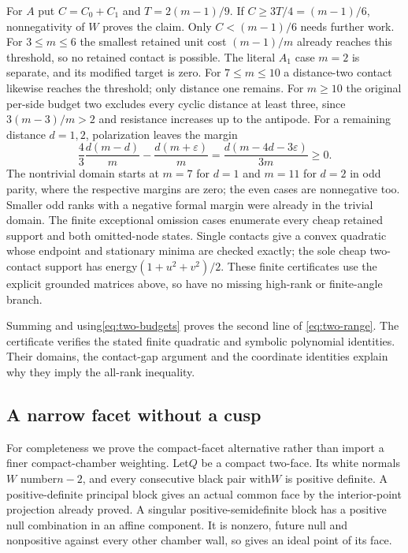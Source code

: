 \documentclass[11pt]{article}
\theoremstyle{remark}\newtheorem{remark}[theorem]{Remark}
\begin{document}
For $A$ put $C=C_0+C_1$ and $T=2(m-1)/9$.
If $C\ge3T/4=(m-1)/6$, nonnegativity of $W$ proves the claim.
Only $C<(m-1)/6$ needs further work. For $3\le m\le6$ the
smallest retained unit cost $(m-1)/m$ already reaches this
threshold, so no retained contact is possible. The literal
$A_1$ case $m=2$ is separate, and its modified target is zero.
For $7\le m\le10$ a distance-two contact likewise reaches the
threshold; only distance one remains. For $m\ge10$ the original
per-side budget two excludes every cyclic distance at least three,
since $3(m-3)/m>2$ and resistance increases up to the antipode.
For a remaining distance $d=1,2$, polarization leaves the margin
\[
 \frac43\frac{d(m-d)}m-\frac{d(m+\varepsilon)}m
 =\frac{d(m-4d-3\varepsilon)}{3m}\ge0.
\]
The nontrivial domain starts at $m=7$ for $d=1$ and $m=11$ for
$d=2$ in odd parity, where the respective margins are zero;
the even cases are nonnegative too. Smaller odd ranks with a
negative formal margin were already in the trivial domain.
The finite exceptional omission cases enumerate every cheap
retained support and both omitted-node states. Single contacts
give a convex quadratic whose endpoint and stationary minima
are checked exactly; the sole cheap two-contact support has
energy$(1+u^2+v^2)/2$. These finite certificates use the
explicit grounded matrices above, so have no missing high-rank
or finite-angle branch.

Summing and using\eqref{eq:two-budgets} proves the second line of
\eqref{eq:two-range}. The certificate verifies the stated finite
quadratic and symbolic polynomial identities. Their domains,
the contact-gap argument and the coordinate identities explain
why they imply the all-rank inequality.

\subsection{A narrow facet without a cusp}

For completeness we prove the compact-facet alternative rather
than import a finer compact-chamber weighting. Let$Q$ be a compact
two-face. Its white normals$W$ number$n-2$, and every consecutive
black pair with$W$ is positive definite. A positive-definite
principal block gives an actual common face by the interior-point
projection already proved. A singular positive-semidefinite block
has a positive null combination in an affine component. It is
nonzero, future null and nonpositive against every other chamber
wall, so gives an ideal point of its face.
\end{document}
